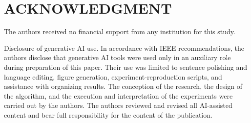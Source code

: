 \documentclass{ieeetj}
\begin{document}
\FloatBarrier
\section*{ACKNOWLEDGMENT}
The authors received no financial support from any institution for this study.

Disclosure of generative AI use. In accordance with IEEE recommendations, the authors disclose that generative AI tools were used only in an auxiliary role during preparation of this paper. Their use was limited to sentence polishing and language editing, figure generation, experiment-reproduction scripts, and assistance with organizing results. The conception of the research, the design of the algorithm, and the execution and interpretation of the experiments were carried out by the authors. The authors reviewed and revised all AI-assisted content and bear full responsibility for the content of the publication.

\balance


\end{document}
